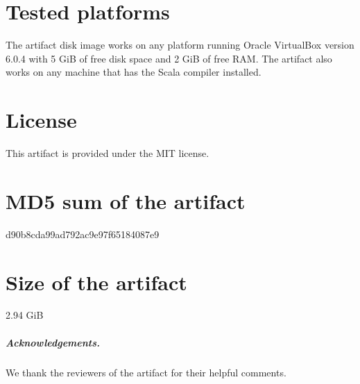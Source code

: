 \documentclass[a4paper,UKenglish]{darts-v2019}
\newenvironment{platforms}{\section{Tested platforms}}{}
\newcommand{\license}[1]{{\section{License}#1}}
\newcommand{\mdsum}[1]{{\section{MD5 sum of the artifact}#1}}
\newcommand{\artifactsize}[1]{{\section{Size of the artifact}#1}}
\begin{document}
\begin{platforms}
The artifact disk image works on any platform running Oracle VirtualBox version 6.0.4
with 5 GiB of free disk space and 2 GiB of free RAM. The artifact also works on any machine
that has the Scala compiler installed.
\end{platforms}

\license{This artifact is provided under the MIT license.}

\mdsum{d90b8cda99ad792ac9e97f65184087e9}

\artifactsize{2.94 GiB}

\subparagraph*{Acknowledgements.}

We thank the reviewers of the artifact for their helpful comments.

%
%




%
\end{document}
